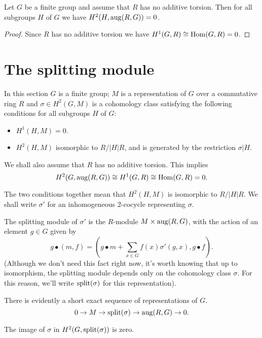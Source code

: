 \begin{lemma}
	Let $G$ be a finite group and assume that $R$ has no additive torsion.
	Then for all subgroups $H$ of $G$ we have $H^2(H,\mathrm{aug}(R,G)) = 0$.
\end{lemma}

\begin{proof}
	Since $R$ has no additive torsion we have
	$H^1(G,R) \cong \mathrm{Hom}(G,R) = 0$.
\end{proof}


\section{The splitting module}

In this section $G$ is a finite group; $M$ is a representation of $G$ over a commutative ring $R$
 and $\sigma \in H^2(G,M)$ is a cohomology class satisfying the following conditions for all
 subgroups $H$ of $G$:
\begin{itemize}
	\item
	$H^1(H,M)=0$.
	\item
	$H^2(H,M)$ isomorphic to $R / |H|R$, and is generated by the restriction $\sigma | H$.
\end{itemize}
We shall also assume that $R$ has no additive torsion. This implies
\[
	H^2(G,\mathrm{aug}(R,G)) \cong H^1(G,R) \cong \mathrm{Hom}(G,R) = 0.
\]


The two conditions together mean that $H^2(H,M)$ is isomorphic to $R/|H|R$.
We shall write $\sigma'$ for an inhomogeneous 2-cocycle representing $\sigma$.

\begin{definition}
	The splitting module of $\sigma'$ is the $R$-module $M \times \mathrm{aug}(R,G)$,
	with the action of an element $g \in G$ given by
	\[
		g \bullet (m,f)
		= \left(g \bullet m + \sum_{x \in G} f(x) \sigma'(g,x) , g \bullet f\right).
	\]
	(Although we don't need this fact right now, it's worth knowing that up to isomorphism, the splitting module depends only on the cohomology class $\sigma$. For this reason, we'll write
	$\mathrm{split}(\sigma)$ for this representation).
\end{definition}



There is evidently a short exact sequence of representations of $G$.
\[
	0 \to M \to \mathrm{split}(\sigma) \to \mathrm{aug}(R,G) \to 0.
\]

\begin{lemma}
	The image of $\sigma$ in $H^2(G,\mathrm{split}(\sigma))$ is zero.
\end{lemma}


